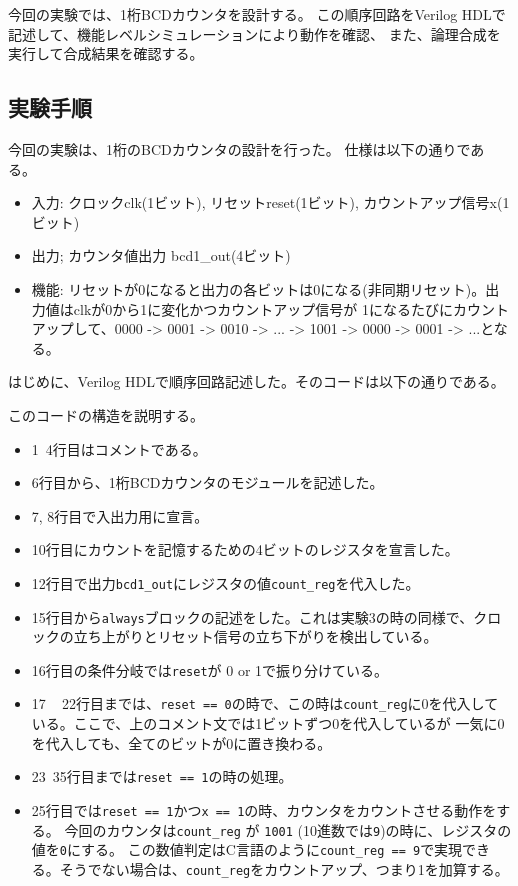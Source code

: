 \documentclass[uplatex]{jsarticle}
\begin{document}
今回の実験では、1桁BCDカウンタを設計する。
この順序回路をVerilog HDLで記述して、機能レベルシミュレーションにより動作を確認、
また、論理合成を実行して合成結果を確認する。

\subsection{実験手順}

今回の実験は、1桁のBCDカウンタの設計を行った。
仕様は以下の通りである。

\begin{itemize}
  \item 入力: クロックclk(1ビット), リセットreset(1ビット), カウントアップ信号x(1ビット)
  \item 出力; カウンタ値出力 bcd1_out(4ビット)
  \item 機能: リセットが0になると出力の各ビットは0になる(非同期リセット)。出力値はclkが0から1に変化かつカウントアップ信号が
	   1になるたびにカウントアップして、0000 -> 0001 -> 0010 -> ... -> 1001 -> 0000 -> 0001 -> ...となる。
\end{itemize}

はじめに、Verilog HDLで順序回路記述した。そのコードは以下の通りである。



このコードの構造を説明する。

\begin{itemize}
  \item 1~4行目はコメントである。
  \item 6行目から、1桁BCDカウンタのモジュールを記述した。
  \item 7, 8行目で入出力用に宣言。
  \item 10行目にカウントを記憶するための4ビットのレジスタを宣言した。
  \item 12行目で出力{\tt bcd1\_out}にレジスタの値{\tt count\_reg}を代入した。
  \item 15行目から{\tt always}ブロックの記述をした。これは実験3の時の同様で、クロックの立ち上がりとリセット信号の立ち下がりを検出している。
  \item 16行目の条件分岐では{\tt reset}が 0 or 1で振り分けている。
  \item 17 ~ 22行目までは、{\tt reset == 0}の時で、この時は{\tt count\_reg}に0を代入している。ここで、上のコメント文では1ビットずつ0を代入しているが
           一気に0を代入しても、全てのビットが0に置き換わる。
  \item 23~35行目までは{\tt reset == 1}の時の処理。
  \item 25行目では{\tt reset == 1}かつ{\tt x == 1}の時、カウンタをカウントさせる動作をする。
          今回のカウンタは{\tt count\_reg} が {\tt 1001} (10進数では{\tt 9})の時に、レジスタの値を{\tt 0}にする。
          この数値判定はC言語のように{\tt count\_reg == 9}で実現できる。そうでない場合は、{\tt count\_reg}をカウントアップ、つまり1を加算する。
\end{itemize}
\end{document}
